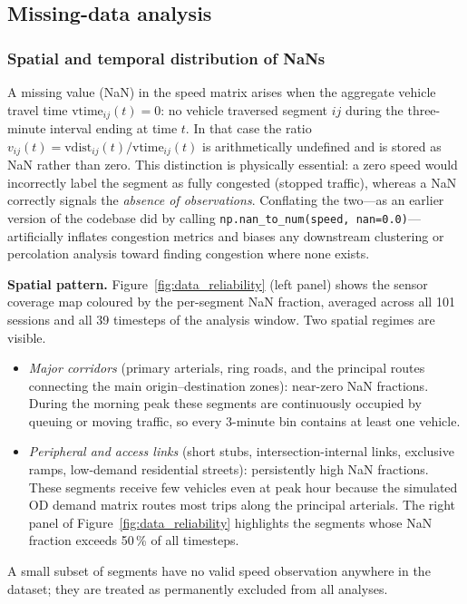 \documentclass[11pt,a4paper]{article}
\begin{document}
\subsection{Missing-data analysis}
\label{sec:data:nan}

\subsubsection{Spatial and temporal distribution of NaNs}
\label{sec:data:nan:dist}

A missing value (NaN) in the speed matrix arises when the aggregate vehicle
travel time $\text{vtime}_{ij}(t) = 0$: no vehicle traversed segment $ij$
during the three-minute interval ending at time $t$.  In that case the ratio
$v_{ij}(t) = \text{vdist}_{ij}(t)/\text{vtime}_{ij}(t)$ is arithmetically
undefined and is stored as NaN rather than zero.  This distinction is
physically essential: a zero speed would incorrectly label the segment as
fully congested (stopped traffic), whereas a NaN correctly signals the
\emph{absence of observations}.  Conflating the two---as an earlier version
of the codebase did by calling \texttt{np.nan\_to\_num(speed,\,nan=0.0)}---
artificially inflates congestion metrics and biases any downstream clustering
or percolation analysis toward finding congestion where none exists.

\medskip
\noindent\textbf{Spatial pattern.}
Figure~\ref{fig:data_reliability} (left panel) shows the sensor coverage map
coloured by the per-segment NaN fraction, averaged across all 101 sessions
and all 39 timesteps of the analysis window.  Two spatial regimes are visible.
\begin{itemize}
  \item \emph{Major corridors} (primary arterials, ring roads, and the
    principal routes connecting the main origin--destination zones): near-zero
    NaN fractions.  During the morning peak these segments are continuously
    occupied by queuing or moving traffic, so every 3-minute bin contains at
    least one vehicle.
  \item \emph{Peripheral and access links} (short stubs, intersection-internal
    links, exclusive ramps, low-demand residential streets): persistently high
    NaN fractions.  These segments receive few vehicles even at peak hour
    because the simulated OD demand matrix routes most trips along the
    principal arterials.  The right panel of Figure~\ref{fig:data_reliability}
    highlights the segments whose NaN fraction exceeds 50\,\% of all timesteps.
\end{itemize}
A small subset of segments have no valid speed observation anywhere in the
dataset; they are treated as permanently excluded from all analyses.
\end{document}
